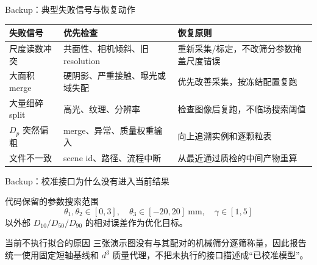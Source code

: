 \documentclass[UTF8,aspectratio=169,11pt]{ctexbeamer}
\begin{document}
\begin{frame}{Backup：典型失败信号与恢复动作}
\small
\renewcommand{\arraystretch}{1.18}
\begin{tabularx}{\linewidth}{>{\raggedright\arraybackslash}p{3.0cm}X X}
\toprule
失败信号 & 优先检查 & 恢复原则 \\
\midrule
尺度读数冲突 & 共面性、相机倾斜、旧 resolution & 重新采集/标定，不改筛分参数掩盖尺度错误 \\
大面积 merge & 硬阴影、严重接触、曝光或域失配 & 优先改善采集，按冻结配置复跑 \\
大量细碎 split & 高光、纹理、分辨率 & 检查图像后复跑，不临场搜索阈值 \\
$D_p$ 突然偏粗 & merge、异常、质量权重输入 & 向上追溯实例和逐颗粒表 \\
文件不一致 & scene id、路径、流程中断 & 从最近通过质检的中间产物重算 \\
\bottomrule
\end{tabularx}
\end{frame}

\begin{frame}{Backup：校准接口为什么没有进入当前结果}
\begin{block}{代码保留的参数搜索范围}
\small
\[
\theta_1,\theta_2\in[0,3],\quad
\theta_3\in[-20,20]\ \mathrm{mm},\quad
\gamma\in[1,5]
\]
以外部 $D_{10}/D_{50}/D_{90}$ 的相对误差作为优化目标。
\end{block}
\vspace{0.4em}

\begin{alertblock}{当前不执行拟合的原因}
\small 三张演示图没有与其配对的机械筛分逐筛称量，因此报告统一使用固定短轴基线和 $d^3$ 质量代理，不把未执行的接口描述成“已校准模型”。
\end{alertblock}
\end{frame}
\end{document}
